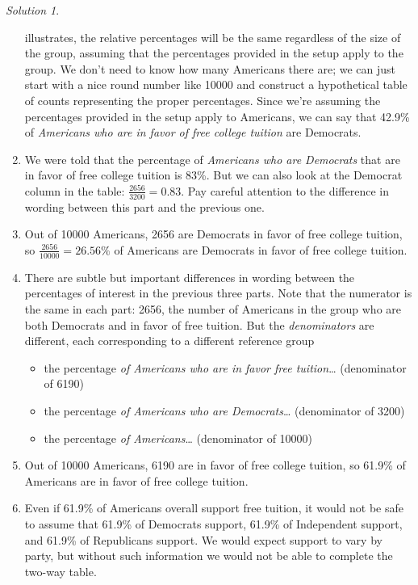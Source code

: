 \documentclass[
  letterpaper,
  DIV=11,
  numbers=noendperiod]{scrreprt}
\providecommand{\tightlist}{%
  \setlength{\itemsep}{0pt}\setlength{\parskip}{0pt}}
\theoremstyle{plain}
\theoremstyle{definition}
\theoremstyle{definition}
\theoremstyle{definition}
\theoremstyle{remark}
\newtheorem{refsolution}{Solution}[chapter]
\begin{document}
\begin{tcolorbox}
\begin{refsolution}
\begin{enumerate}
  illustrates, the relative percentages will be the same regardless of
  the size of the group, assuming that the percentages provided in the
  setup apply to the group. We don't need to know how many Americans
  there are; we can just start with a nice round number like 10000 and
  construct a hypothetical table of counts representing the proper
  percentages. Since we're assuming the percentages provided in the
  setup apply to Americans, we can say that 42.9\% of \emph{Americans
  who are in favor of free college tuition} are Democrats.
\item
  We were told that the percentage of \emph{Americans who are Democrats}
  that are in favor of free college tuition is 83\%. But we can also
  look at the Democrat column in the table:
  \(\frac{2656}{3200} = 0.83\). Pay careful attention to the difference
  in wording between this part and the previous one.
\item
  Out of 10000 Americans, 2656 are Democrats in favor of free college
  tuition, so \(\frac{2656}{10000}= 26.56\%\) of Americans are Democrats
  in favor of free college tuition.
\item
  There are subtle but important differences in wording between the
  percentages of interest in the previous three parts. Note that the
  numerator is the same in each part: 2656, the number of Americans in
  the group who are both Democrats and in favor of free tuition. But the
  \emph{denominators} are different, each corresponding to a different
  reference group

  \begin{itemize}
  \tightlist
  \item
    the percentage \emph{of Americans who are in favor free
    tuition}\ldots{} (denominator of 6190)
  \item
    the percentage \emph{of Americans who are Democrats}\ldots{}
    (denominator of 3200)
  \item
    the percentage \emph{of Americans}\ldots{} (denominator of 10000)
  \end{itemize}
\item
  Out of 10000 Americans, 6190 are in favor of free college tuition, so
  61.9\% of Americans are in favor of free college tuition.
\item
  Even if 61.9\% of Americans overall support free tuition, it would not
  be safe to assume that 61.9\% of Democrats support, 61.9\% of
  Independent support, and 61.9\% of Republicans support. We would
  expect support to vary by party, but without such information we would
  not be able to complete the two-way table.
\end{enumerate}

\label{sol-free-college-twoway}

\end{refsolution}

\end{tcolorbox}
\end{document}
